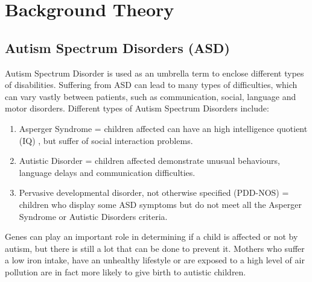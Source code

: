 \chapter{Background Theory}

  
\newenvironment{conditions}[1][where:]
  {#1 \begin{tabular}[t]{>{$}l<{$} @{${}={}$} l}}
  {\end{tabular}\\[\belowdisplayskip]}

\label{ch:background}

\section{Autism Spectrum Disorders (ASD)}
Autism Spectrum Disorder is used as an umbrella term to enclose different types of disabilities. Suffering from ASD can lead to many types of difficulties, which can vary vastly between patients, such as communication, social, language and motor disorders. Different types of Autism Spectrum Disorders include:

\begin{enumerate}
\itemsep0em
\item Asperger Syndrome = children affected can have an high intelligence quotient (IQ) , but suffer of social interaction problems.
\item Autistic Disorder = children affected demonstrate unusual behaviours, language delays and communication difficulties. 
\item Pervasive developmental disorder, not otherwise specified (PDD-NOS) = children who display some ASD symptoms but do not meet all the Asperger Syndrome or Autistic Disorders criteria.  
\end{enumerate}

Genes can play an important role in determining if a child is affected or not by autism, but there is still a lot that can be done to prevent it. Mothers who suffer a low iron intake, have an unhealthy lifestyle or are exposed to a high level of air pollution are in fact more likely to give birth to autistic children.

